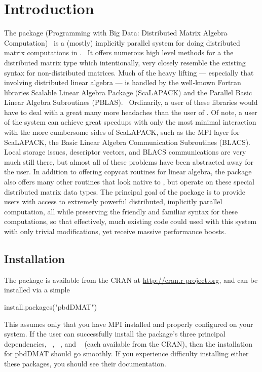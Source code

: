 
\section[]{Introduction}
\label{sec:introduction}

The  package (Programming with Big Data: Distributed Matrix Algebra Computation)~\citep{Schmidt2012pbdDMATpackage} is a (mostly) implicitly parallel system for doing distributed matrix computations in .~\citep{Rcore}  It offers numerous high level methods for a the ~\citep{Schmidt2012pbdBASEpackage} distributed matrix type  which intentionally, very closely resemble the existing  syntax for non-distributed matrices.  Much of the heavy lifting --- especially that involving distributed linear algebra --- is handled by the well-known Fortran libraries Scalable Linear Algebra Package (ScaLAPACK) and the Parallel Basic Linear Algebra Subroutines (PBLAS).~\citep{slug}
\np
Ordinarily, a user of these libraries would have to deal with a great many more headaches than the user of .  Of note, a user of the  system can achieve great speedups with only the most minimal interaction with the more cumbersome sides of ScaLAPACK, such as the MPI layer for ScaLAPACK, the Basic Linear Algebra Communication Subroutines (BLACS).~\citep{blug}  Local storage issues, descriptor vectors, and BLACS communications are very much still there, but almost all of these problems have been abstracted away for the user.  In addition to offering copycat routines for linear algebra, the  package also offers many other routines that look native to , but operate on these special distributed matrix data types.
\np
The principal goal of the  package is to provide  users with access to extremely powerful distributed, implicitly parallel computation, all while preserving the friendly and familiar  syntax for these computations, so that effectively, much existing  code could used with this system with only trivial modifications, yet receive massive performance boosts.

\subsection[]{Installation}
\label{sec:installation}

The  package is available from the CRAN at
\url{http://cran.r-project.org}, and can be installed via a simple 
\begin{Code}
install.packages("pbdDMAT")
\end{Code}
This assumes only that you have MPI installed and properly configured on your system.  If the user can successfully install the package's three principal dependencies, ~\citep{Chen2012pbdMPIpackage}, ~\citep{Chen2012pbdSLAPpackage}, and ~\citep{Schmidt2012pbdBASEpackage} (each available from the CRAN), then the installation for pbdDMAT should go smoothly.  If you experience difficulty installing either these packages, you should see their documentation.

